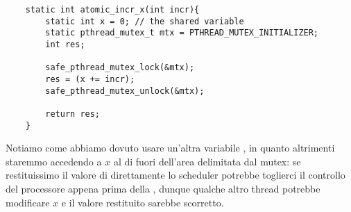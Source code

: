 \begin{verbatim}
    static int atomic_incr_x(int incr){
        static int x = 0; // the shared variable
        static pthread_mutex_t mtx = PTHREAD_MUTEX_INITIALIZER;
        int res;

        safe_pthread_mutex_lock(&mtx);
        res = (x += incr);
        safe_pthread_mutex_unlock(&mtx);

        return res;
    }
\end{verbatim}

Notiamo come abbiamo dovuto usare un'altra variabile , in quanto altrimenti staremmo accedendo a $x$ al di fuori dell'area delimitata dal mutex: se restituissimo il valore di  direttamente lo scheduler potrebbe toglierci il controllo del processore appena prima della , dunque qualche altro thread potrebbe modificare $x$ e il valore restituito sarebbe scorretto.